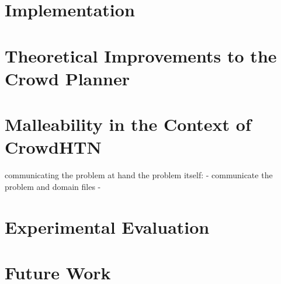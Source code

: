 \documentclass[enabledeprecatedfontcommands,12pt,a4paper,twoside]{scrartcl}
\numberwithin{equation}{section}
\begin{document}
\section{Implementation}



\section{Theoretical Improvements to the Crowd Planner}




\section{Malleability in the Context of CrowdHTN}
communicating the problem at hand
the problem itself:
	- communicate the problem and domain files
	- 



\section{Experimental Evaluation}

\section{Future Work}

\clearpage




\end{document}
